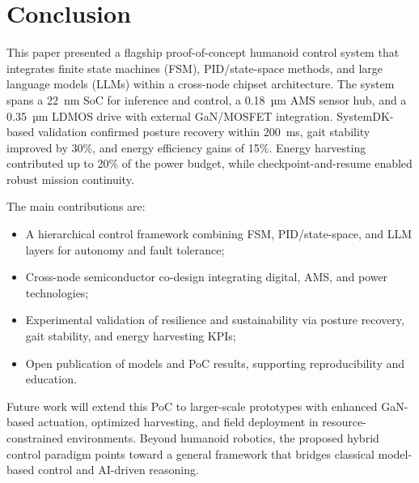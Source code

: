 \section{Conclusion}
This paper presented a flagship proof-of-concept humanoid control system
that integrates finite state machines (FSM), PID/state-space methods,
and large language models (LLMs) within a cross-node chipset architecture.
The system spans a 22~nm SoC for inference and control,
a 0.18~µm AMS sensor hub, and a 0.35~µm LDMOS drive with external GaN/MOSFET integration.
SystemDK-based validation confirmed posture recovery within 200~ms,
gait stability improved by 30\%, and energy efficiency gains of 15\%.
Energy harvesting contributed up to 20\% of the power budget,
while checkpoint-and-resume enabled robust mission continuity.

The main contributions are:
\begin{itemize}
  \item A hierarchical control framework combining FSM, PID/state-space, and LLM layers
        for autonomy and fault tolerance;
  \item Cross-node semiconductor co-design integrating digital, AMS, and power technologies;
  \item Experimental validation of resilience and sustainability via posture recovery,
        gait stability, and energy harvesting KPIs;
  \item Open publication of models and PoC results, supporting reproducibility and education.
\end{itemize}

Future work will extend this PoC to larger-scale prototypes with enhanced GaN-based
actuation, optimized harvesting, and field deployment in resource-constrained environments.
Beyond humanoid robotics, the proposed hybrid control paradigm points toward a
general framework that bridges classical model-based control and AI-driven reasoning.
